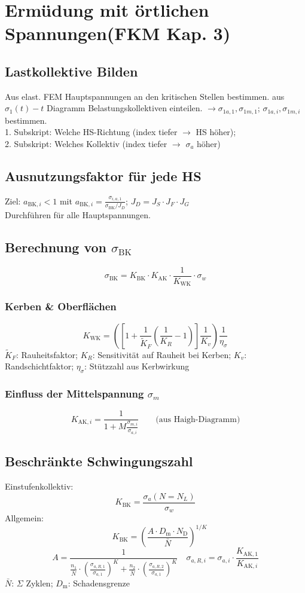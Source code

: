 \section{Ermüdung mit örtlichen Spannungen(FKM Kap. 3)}
    \TODO{}
    \subsection{Lastkollektive Bilden}
    Aus elast. FEM Hauptspannungen an den kritischen Stellen bestimmen.
    aus $\sigma_1(t)-t$ Diagramm Belastungskollektiven einteilen. $\rightarrow \sigma_{1a,1}, \sigma_{1m,1}$; $\sigma_{1a,i}, \sigma_{1m,i}$ bestimmen.
    \\1. Subskript: Welche HS-Richtung (index tiefer $\rightarrow$ HS höher); 
    \\2. Subskript: Welches Kollektiv (index tiefer $\rightarrow$ $\sigma_a$ höher)
    \subsection{Ausnutzungsfaktor für jede HS}
        Ziel: $a_{\textrm{BK},i} < 1$ mit $\displaystyle a_{\textrm{BK},i} = \frac{\sigma_{i,a,1}}{\sigma_{\textrm{BK}}/J_D}$; \quad $J_D=J_S\cdot J_F \cdot J_G$ 
        \\Durchführen für alle Hauptspannungen.
    \subsection{Berechnung von $\sigma_{\textrm{BK}}$}
        \[\sigma_{\textrm{BK}} = K_{\textrm{BK}} \cdot K_{\textrm{AK}} \cdot \frac{1}{K_{\textrm{WK}}} \cdot \sigma_w \]
        \subsubsection{Kerben \& Oberflächen}
            \[K_{\textrm{WK}}=\left(\left[1+\frac{1}{\widetilde{K}_F}\left(\frac{1}{K_R}-1\right)\right]\frac{1}{K_v}\right)\frac{1}{\eta_{\sigma}}\]
            $\widetilde{K}_F$: Rauheitsfaktor;   $K_R$: Sensitivität auf Rauheit bei Kerben;     $K_v$: Randschichtfaktor;   $\eta_{\sigma}$: Stützzahl aus Kerbwirkung
        \subsubsection{Einfluss der Mittelspannung $\sigma_m$}
            \[K_{\textrm{AK},i}=\frac{1}{1+M\frac{\sigma_{m,i}}{\sigma_{a,i}}} \quad\quad\textrm{(aus Haigh-Diagramm)}\]
        \subsection{Beschränkte Schwingungszahl}
            Einstufenkollektiv: \[K_{\textrm{BK}}= \frac{\sigma_{a}(N=N_L)}{\sigma_w}\]
            Allgemein: \[\quad K_{\textrm{BK}}=\left(\frac{A\cdot D_{\textrm{m}}\cdot N_{\textrm{D}}}{\bar{N}}\right)^{1/K}\]
            \[A = \frac{1}{\frac{n_1}{\bar{N}}\cdot\left(\frac{\sigma_{a,R,1}}{\sigma_{a,1}}\right)^{K}+\frac{n_2}{\bar{N}}\cdot\left(\frac{\sigma_{a,R,2}}{\sigma_{a,1}}\right)^{K}}\quad \sigma_{a,R,i}=\sigma_{a,i}\cdot\frac{K_{\textrm{AK},1}}{K_{\textrm{AK},i}}\]
            $\bar{N}$: $\Sigma$ Zyklen;  $D_{\textrm{m}}$: Schadensgrenze 